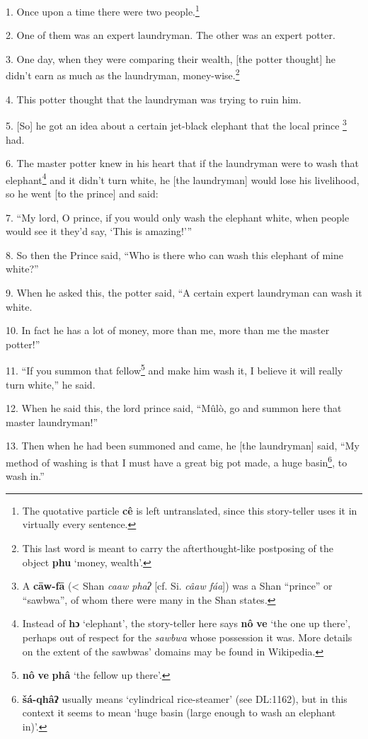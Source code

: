 \setcounter{footnote}{0}

1. Once upon a time there were two people.\footnote{The quotative particle \textbf{cê} is left untranslated, since this story-teller uses it in virtually every sentence.}

2. One of them was an expert laundryman. The other was an expert potter.

3. One day, when they were comparing their wealth, [the potter thought] he didn't
earn as much as the laundryman, money-wise.\footnote{This last word is meant to carry the afterthought-like postposing of the object \textbf{phu} `money, wealth'.}

4. This potter thought that the laundryman was trying to ruin him.

5. [So] he got an idea about a certain jet-black elephant that the local prince
\footnote{A \textbf{cāw-fā} (< Shan \textit{caaw phaʔ} [cf. Si. \textit{câaw fáa}]) was a Shan ``prince'' or ``sawbwa'', of whom there were many in the Shan states.} had.

6. The master potter knew in his heart that if the laundryman were to wash that
elephant\footnote{Instead of \textbf{hɔ} `elephant', the story-teller here says \textbf{nô} \textbf{ve} `the one up there', perhaps out of respect for the \textit{sawbwa} whose possession it was. More details on the extent of the sawbwas' domains may be found in Wikipedia.} and it didn't turn white, he [the laundryman] would lose his livelihood,
so he went [to the prince] and said:

7. ``My lord, O prince, if you would only wash the elephant white, when people
would see it they'd say, `This is amazing!'''

8. So then the Prince said, ``Who is there who can wash this elephant of mine white?''

9. When he asked this, the potter said, ``A certain expert laundryman can wash
it white.

10. In fact he has a lot of money, more than me, more than me the master potter!''

11. ``If you summon that fellow\footnote{\textbf{nô} \textbf{ve} \textbf{phâ} `the fellow up there'.} and make him wash it, I believe it will really
turn white,'' he said.

12. When he said this, the lord prince said, ``Mûlò, go and summon here that
master laundryman!''

13. Then when he had been summoned and came, he [the laundryman] said, ``My method
of washing is that I must have a great big pot made, a huge basin\footnote{\textbf{šá-qhâʔ} usually means `cylindrical rice-steamer' (see DL:1162), but in this context it seems to mean `huge basin (large enough to wash an elephant in)'.}, to wash
in.''

